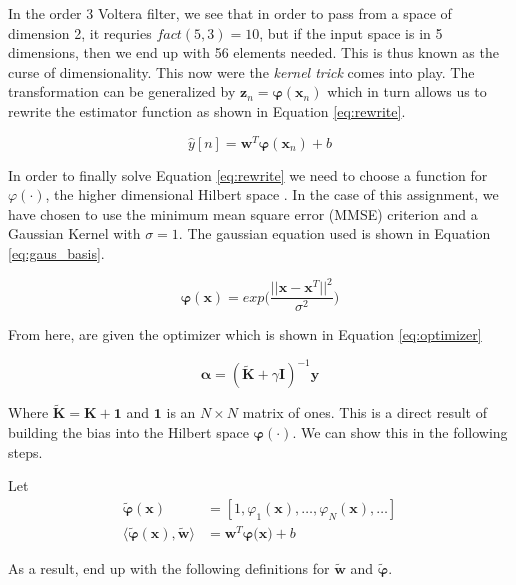 \documentclass[11pt, twoside]{article}   	%
\begin{document}
 In the order 3 Voltera filter, we see that in order to pass from a space of dimension 2, it requries $fact(5, 3) = 10$, but if the input space is in 5 dimensions, then we end up with 56 elements needed.
 This is thus known as the curse of dimensionality. This now were the \textit{kernel trick} comes into play.  The transformation can be generalized by $\mathbf{z}_n = \mathbf{\varphi}(\mathbf{x}_n)$ 
 which in turn allows us to rewrite the estimator function as shown in Equation \ref{eq:rewrite}. 
 
 \begin{equation}
\hat{y}[n] = \mathbf{w}^T\mathbf{\varphi}(\mathbf{x}_n) + b
\label{eq:rewrite}
\end{equation}

In order to finally solve Equation \ref{eq:rewrite} we need to choose a function for $\varphi(\cdot)$, the higher dimensional Hilbert space \cite{kernelmethods}. In 
the case of this assignment, we have chosen to use the minimum mean square error (MMSE) criterion and a Gaussian Kernel with $\sigma = 1$. The gaussian equation 
used is shown in Equation \ref{eq:gaus_basis}.

\begin{equation}
\mathbf{\varphi(x)} = exp\bigg(\frac{||\mathbf{x} - \mathbf{x}^T||^2}{\sigma^2}\bigg)
\label{eq:gaus_basis}
\end{equation}

From here, are given the optimizer which is shown in Equation \ref{eq:optimizer} 

\begin{equation}
\mathbf{\alpha} = (\mathbf{\widetilde{K}} + \gamma \mathbf{I})^{-1}\mathbf{y}
\label{eq:optimizer}
\end{equation}

Where $\mathbf{\widetilde{K}} = \mathbf{K} + \mathbf{1}$ and $\mathbf{1}$ is an $N \times N$ matrix of ones. This is a direct result
of building the bias into the Hilbert space $\mathbf{\varphi(\cdot)}$. We can show this in the following steps. 

Let 
\begin{align*}
\mathbf{\widetilde{\varphi}(x)} &= [1, \varphi_1(\mathbf{x}),  \ldots, \varphi_N(\mathbf{x}), \ldots ] \\
\langle\mathbf{\widetilde{\varphi}(x)}, \mathbf{\widetilde{w}} \rangle &= \mathbf{w}^T\mathbf{\varphi(\mathbf{x}}) + b 
\end{align*}

As a result, end up with the following definitions for $\mathbf{\widetilde{w}}$ and $\mathbf{\widetilde{\varphi}}$.
\newcommand{\newPhi}{\mathbf{\widetilde{\varphi}}}
\end{document}
